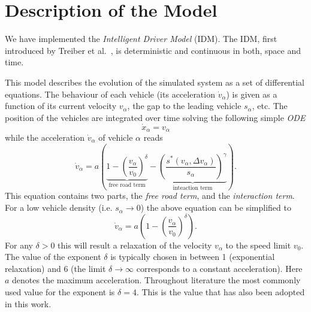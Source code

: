 \section{Description of the Model}
\label{sec:model}
We have implemented the \emph{Intelligent Driver Model} (IDM). The IDM, first introduced by Treiber et al.\ \cite{treiber1999, treiber2000}, is deterministic and continuous in both, space and time.

This model describes the evolution of the simulated system as a set of differential equations. The behaviour of each vehicle (its acceleration $\dot{v}_\alpha$) is given as a function of its current velocity $v_\alpha$, the gap to the leading vehicle $s_\alpha$, etc.
The position of the vehicles are integrated over time solving the following simple \emph{ODE}
\begin{equation}
\dot{x}_\alpha = v_\alpha
\end{equation}
while the acceleration $\dot v_\alpha$ of vehicle $\alpha$ reads 
\begin{equation}
\dot v_\alpha = a\left(\underbrace{1-\left(\frac{v_\alpha}{v_0}\right)^\delta}_{\text{free road term}} - \underbrace{\left(\frac{s^*(v_\alpha, \Delta v_\alpha)}{s_\alpha}\right)^\gamma}_{\text{inteaction term}}\right).
\label{eq:IDM}
\end{equation}
This equation contains two parts, the \emph{free road term}, and the \emph{interaction term}. For a low vehicle density (i.e. $s_\alpha \rightarrow 0$)  the above equation can be simplified to
\begin{equation}
\dot v_\alpha = a\left(1-\left(\frac{v_\alpha}{v_0}\right)^\delta\right).
\end{equation}
For any $\delta>0$ this will result a relaxation of the velocity $v_\alpha$ to the speed limit $v_0$. The value of the exponent $\delta$ is typically chosen in between 1 (exponential relaxation) and 6 (the limit $\delta\rightarrow \infty$ corresponds to a constant acceleration). Here $a$ denotes the maximum acceleration. Throughout literature the most commonly used value for the exponent is $\delta=4$. This is the value that has also been adopted in this work.

